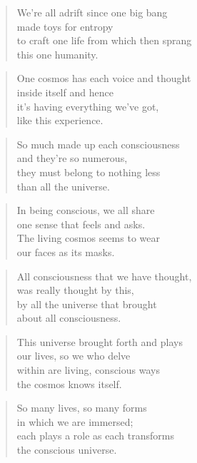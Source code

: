 \documentclass[14pt,a4paper]{article}
\begin{document}
\begin{verse}
We’re all adrift since one big bang\\
made toys for entropy\\
to craft one life from which then sprang\\
this one humanity.
\end{verse}

\begin{verse}
One cosmos has each voice and thought\\
inside itself and hence\\
it’s having everything we’ve got,\\
like this experience.
\end{verse}

\begin{verse}
So much made up each consciousness\\
and they’re so numerous,\\
they must belong to nothing less\\
than all the universe.
\end{verse}

\begin{verse}
In being conscious, we all share\\
one sense that feels and asks.\\
The living cosmos seems to wear\\
our faces as its masks.
\end{verse}

\begin{verse}
All consciousness that we have thought,\\
was really thought by this,\\
by all the universe that brought\\
about all consciousness.
\end{verse}

\begin{verse}
This universe brought forth and plays\\
our lives, so we who delve\\
within are living, conscious ways\\
the cosmos knows itself.
\end{verse}

\begin{verse}
So many lives, so many forms\\
in which we are immersed;\\
each plays a role as each transforms\\
the conscious universe.
\end{verse}
\end{document}
